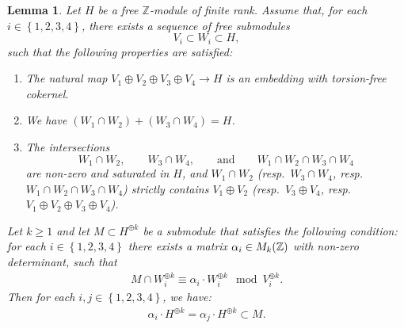 \documentclass[a4paper,11pt,reqno]{amsart}
\numberwithin{equation}{section}
\theoremstyle{plain}
\newtheorem{lemma}[theorem]{Lemma}
\theoremstyle{definition}
\newcommand{\Z}{\mathbb Z}
\let\rm\relax
\newcommand{\rm}[1]{{\mathrm{#1}}}
\newcommand{\set}[1]{\left\{ #1 \right\}}
\begin{document}
\begin{lemma} \label{lemma:matricessaturatedsubmodules}
Let $H$ be a free $\Z$-module of finite rank. Assume that, for each $i \in \set{1,2,3,4}$, there exists a sequence of free submodules 
$$
V_i \subset W_i  \subset H,
$$
such that the following properties are satisfied:
\begin{enumerate} 
\item \label{item:embeddingTFcokernel} The natural map $V_1 \oplus V_2 \oplus V_3 \oplus V_4 \to H$ is an embedding with torsion-free cokernel.  
\item \label{item:H1H2H} We have 
$(W_1 \cap W_2) + (W_3 \cap W_4) = H$.
\item \label{item:nonemptysaturatedintersection} The intersections $$W_1 \cap {W_2}, \quad \quad  {W_3} \cap {W_4}, \quad \quad \text{and} \quad \quad W_1 \cap W_2 \cap W_3 \cap W_4$$ are non-zero and saturated in $H$, and $W_1 \cap W_2$ (resp.\ $W_3 \cap W_4$, resp.\ $W_1\cap W_2 \cap W_3 \cap W_4$) strictly contains $V_1 \oplus V_2$ (resp.\ $V_3 \oplus V_4$, resp.\ $V_1 \oplus V_2 \oplus V_3 \oplus V_4$).  
\end{enumerate}
Let $k\geq 1$ and let $M \subset H^{\oplus k}$ be a submodule that satisfies the following condition: for each $i \in \set{1,2,3,4}$ there exists a matrix $\alpha_i \in \rm{M}_k(\Z)$ with non-zero determinant, such that 
\begin{align} \label{hypothesis:MVik}
M \cap W_i^{\oplus k} \equiv \alpha_i \cdot W_i^{\oplus k} \mod V_i^{\oplus k}. 
\end{align}
Then for each $i,j \in \set{1,2,3,4}$, 
we have:
\begin{align} \label{align:MV1V2-equality:app} 
\alpha_i \cdot H^{\oplus k} = \alpha_j \cdot H^{\oplus k} \subset M.  
\end{align} 
\end{lemma}
\end{document}
